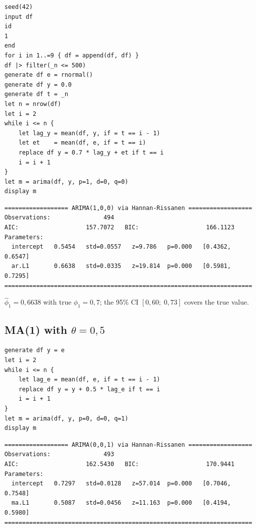 \begin{lstlisting}[caption={AR(1) DGP and estimation}]
seed(42)
input df
id
1
end
for i in 1..=9 { df = append(df, df) }
df |> filter(_n <= 500)
generate df e = rnormal()
generate df y = 0.0
generate df t = _n
let n = nrow(df)
let i = 2
while i <= n {
    let lag_y = mean(df, y, if = t == i - 1)
    let et    = mean(df, e, if = t == i)
    replace df y = 0.7 * lag_y + et if t == i
    i = i + 1
}
let m = arima(df, y, p=1, d=0, q=0)
display m
\end{lstlisting}

\begin{lstlisting}[language={}, basicstyle=\ttfamily\small,
  frame=none, numbers=none, backgroundcolor=\color{codbg},
  xleftmargin=0pt, xrightmargin=0pt, breaklines=false]
================== ARIMA(1,0,0) via Hannan-Rissanen ==================
Observations:               494
AIC:                   157.7072   BIC:                   166.1123
Parameters:
  intercept   0.5454   std=0.0557   z=9.786   p=0.000   [0.4362, 0.6547]
  ar.L1       0.6638   std=0.0335   z=19.814  p=0.000   [0.5981, 0.7295]
======================================================================
\end{lstlisting}

$\hat\phi_1 = 0{,}6638$ with true $\phi_1 = 0{,}7$; the 95\% CI $[0{,}60;\;
0{,}73]$ covers the true value.

\subsection*{MA(1) with $\theta = 0{,}5$}

\begin{lstlisting}[caption={MA(1) DGP and estimation}]
generate df y = e
let i = 2
while i <= n {
    let lag_e = mean(df, e, if = t == i - 1)
    replace df y = y + 0.5 * lag_e if t == i
    i = i + 1
}
let m = arima(df, y, p=0, d=0, q=1)
display m
\end{lstlisting}

\begin{lstlisting}[language={}, basicstyle=\ttfamily\small,
  frame=none, numbers=none, backgroundcolor=\color{codbg},
  xleftmargin=0pt, xrightmargin=0pt, breaklines=false]
================== ARIMA(0,0,1) via Hannan-Rissanen ==================
Observations:               493
AIC:                   162.5430   BIC:                   170.9441
Parameters:
  intercept   0.7297   std=0.0128   z=57.014  p=0.000   [0.7046, 0.7548]
  ma.L1       0.5087   std=0.0456   z=11.163  p=0.000   [0.4194, 0.5980]
======================================================================
\end{lstlisting}

